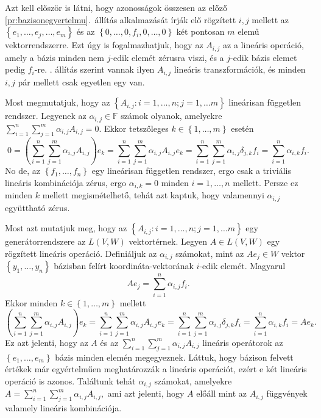 \documentclass[a4paper, showtrims]{memoir}
\makeatletter
\renewenvironment{proof}[1][\proofname]
    {\par\pushQED{\qed}%
    \normalfont \topsep6\p@\@plus6\p@\relax
    \trivlist
    \item[\hskip\labelsep
        \itshape
    #1\@addpunct{:}]\ignorespaces}
    {\popQED\endtrivlist\@endpefalse}
\theoremstyle{plain}
\theoremstyle{remark}
\theoremstyle{definition}
\makeatother
\begin{document}
\begin{proof}
    Azt kell először is látni, hogy  azonosságok összesen az előző \ref{pr:bazisonegyertelmu}.~állítás
	alkalmazását írják elő rögzített $i,j$ mellett az
	\begin{math}
		\left\{ e_1,\ldots,e_j,\ldots,e_m \right\}
	\end{math}
	és az
	\begin{math}
		\left\{ 0,\ldots,0,f_i,0,\ldots,0 \right\}
	\end{math}
	két pontosan $m$ elemű vektorrendszerre.
	Ezt úgy is fogalmazhatjuk, hogy az $A_{i,j}$ az a lineáris operáció,
	amely a bázis minden nem $j$-edik elemét zérusra viszi, és a $j$-edik bázis elemet
	pedig $f_i$-re.
    . állítás szerint vannak ilyen $A_{i,j}$ lineáris transzformációk,
	és minden $i,j$ pár mellett csak egyetlen egy van.

	Most megmutatjuk, hogy az $\left\{ A_{i,j}:i=1,\ldots,n;j=1,\dots m \right\}$ lineárisan független
	rendszer.
	Legyenek az $\alpha_{i,j}\in\mathbb{F}$ számok olyanok,
	amelyekre
	\begin{math}
		\sum_{i=1}^n\sum_{j=1}^m\alpha_{i,j}A_{i,j}=0.
	\end{math}
	Ekkor tetszőleges $k\in\left\{ 1,\ldots,m \right\}$ esetén
	\[
		0=
		\left( \sum_{i=1}^n\sum_{j=1}^m\alpha_{i,j}A_{i,j} \right)e_k
		=
		\sum_{i=1}^n\sum_{j=1}^m\alpha_{i,j}A_{i,j}e_k
		=
		\sum_{i=1}^n\sum_{j=1}^m\alpha_{i,j}\delta_{j,k}f_i
		=
		\sum_{i=1}^n\alpha_{i,k}f_i.
	\]
	No de, az $\left\{f_1,\ldots,f_n  \right\}$ egy lineárisan független rendszer,
	ergo csak a  triviális lineáris kombinációja zérus,
	ergo $\alpha_{i,k}=0$ minden $i=1,\ldots,n$ mellett.
	Persze ez minden $k$ mellett megismételhető, tehát azt kaptuk, hogy valamennyi $\alpha_{i,j}$ együttható
	zérus.

	Most azt mutatjuk meg, hogy az $\left\{ A_{i,j}:i=1,\ldots,n;j=1,\dots m \right\}$ egy
	generátorrendszere az $L\left( V,W \right)$ vektortérnek.
	Legyen $A\in L\left( V,W \right)$ egy rögzített lineáris operáció.
	Definiáljuk az $\alpha_{i,j}$ számokat,
	mint az $Ae_{j}\in W$ vektor $\left\{ y_1,\ldots,y_n \right\}$ bázisban felírt koordináta-vektorának
	$i$-edik elemét.
	Magyarul
	\[
		Ae_j=
		\sum_{i=1}^n\alpha_{i,j}f_i.
	\]
	Ekkor minden $k\in\left\{ 1,\ldots,m \right\}$ mellett
	\[
		\left( \sum_{i=1}^n\sum_{j=1}^m\alpha_{i,j}A_{i,j} \right)e_k
		=
		\sum_{i=1}^n\sum_{j=1}^m\alpha_{i,j}A_{i,j}e_k
		=
		\sum_{i=1}^n\sum_{j=1}^m\alpha_{i,j}\delta_{j,k}f_i
		=
		\sum_{i=1}^n\alpha_{i,k}f_i
		=Ae_k.
	\]
	Ez azt jelenti, hogy az $A$ és az
	\begin{math}
		\sum_{i=1}^n\sum_{j=1}^m\alpha_{i,j}A_{i,j}
	\end{math}
	lineáris operátorok az $\left\{ e_1,\ldots,e_m \right\}$ bázis minden elemén megegyeznek.
	Láttuk, hogy bázison felvett értékek már egyértelműen meghatározzák a lineáris operációt,
	ezért e két lineáris operáció is azonos.
	Találtunk tehát $\alpha_{i,j}$ számokat, amelyekre
	\begin{math}
		A=
		\sum_{i=1}^n\sum_{j=1}^m\alpha_{i,j}A_{i,j},
	\end{math}
	ami azt jelenti, hogy $A$ előáll mint az $A_{i,j}$ függvények valamely lineáris kombinációja.
\end{proof}
\end{document}

